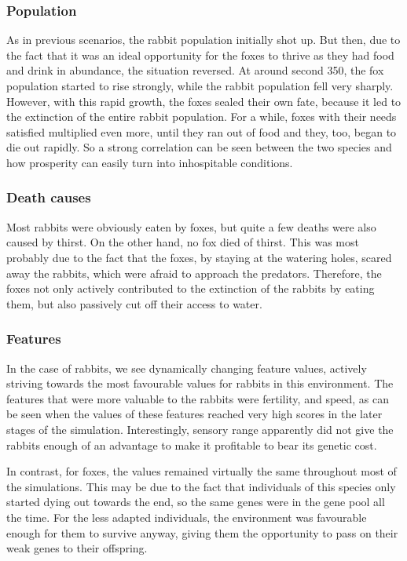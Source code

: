 \subsubsection{Population}
As in previous scenarios, the rabbit population initially shot up. But then, due to the fact that it was an ideal opportunity for the foxes to thrive as they had food and drink in abundance, the situation reversed. At around second 350, the fox population started to rise strongly, while the rabbit population fell very sharply. However, with this rapid growth, the foxes sealed their own fate, because it led to the extinction of the entire rabbit population. For a while, foxes with their needs satisfied multiplied even more, until they ran out of food and they, too, began to die out rapidly. So a strong correlation can be seen between the two species and how prosperity can easily turn into inhospitable conditions.

\subsubsection{Death causes}
Most rabbits were obviously eaten by foxes, but quite a few deaths were also caused by thirst. On the other hand, no fox died of thirst. This was most probably due to the fact that the foxes, by staying at the watering holes, scared away the rabbits, which were afraid to approach the predators. Therefore, the foxes not only actively contributed to the extinction of the rabbits by eating them, but also passively cut off their access to water.

\subsubsection{Features}
In the case of rabbits, we see dynamically changing feature values, actively striving towards the most favourable values for rabbits in this environment. The features that were more valuable to the rabbits were fertility, and speed, as can be seen when the values of these features reached very high scores in the later stages of the simulation. Interestingly, sensory range apparently did not give the rabbits enough of an advantage to make it profitable to bear its genetic cost. 

In contrast, for foxes, the values remained virtually the same throughout most of the simulations. This may be due to the fact that individuals of this species only started dying out towards the end, so the same genes were in the gene pool all the time. For the less adapted individuals, the environment was favourable enough for them to survive anyway, giving them the opportunity to pass on their weak genes to their offspring.

